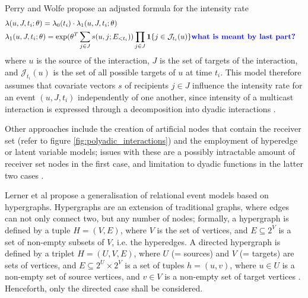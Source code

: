 Perry and Wolfe \cite{perry2013point} propose an adjusted formula for the intensity rate
\begin{align*}
	&\lambda(u,J,t_i;\theta) = \lambda_0(t_i) \cdot \lambda_1(u,J,t_i;\theta)&&\\
	&\lambda_1(u,J,t_i;\theta) = \exp(\theta^T \sum_{j\in J} s(u,j;E_{<t_i})) \prod_{j\in J} \mathbf{1}\{j \in \mathcal{J}_{t_i} (u)\} \textbf{\textcolor{blue}{what is meant by last part?}}&&
\end{align*}
where $u$ is the source of the interaction, $J$ is the set of targets of the interaction, and $\mathcal{J}_{t_i} (u)$ is the set of all possible targets of $u$ at time $t_i$. This model therefore assumes that covariate vectors $s$ of recipients $j \in J$ influence the intensity rate for an event $(u,J,t_i)$ independently of one another, since intensity of a multicast interaction is expressed through a decomposition into dyadic interactions \cite{perry2013point,lerner2021relational}.

Other approaches include the creation of artificial nodes that contain the receiver set (refer to figure \ref{fig:polyadic_interactions}) and the employment of hyperedge or latent variable models; issues with these are a possibly intractable amount of receiver set nodes in the first case, and limitation to dyadic functions in the latter two cases \cite{lerner2021relational}. 
\bigskip

\noindent Lerner et al \cite{lerner2019rem} propose a generalisation of relational event models based on hypergraphs. Hypergraphs are an extension of traditional graphs, where edges can not only connect two, but any number of nodes; formally, a hypergraph is defined by a tuple $H = (V, E)$, where $V$ is the set of vertices, and $E \subseteq 2^V$ is a set of non-empty subsets of $V$, i.e. the hyperedges. A directed hypergraph is defined by a triplet $H = (U,V,E)$, where $U$ (= sources) and $V$ (= targets) are sets of vertices, and $E \subseteq 2^U \times 2^V$ is a set of tuples $h = (u,v)$, where $u \in U$ is a non-empty set of source vertices, and $v \in V$ is a non-empty set of target vertices \cite{wang2018development,lerner2019rem}. Henceforth, only the directed case shall be considered.

